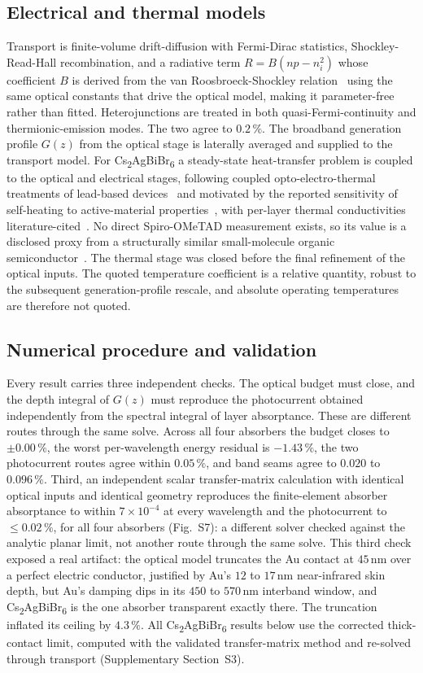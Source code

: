 \documentclass[lettersize,journal]{IEEEtran}
\newcommand{\CABB}{Cs\textsubscript{2}AgBiBr\textsubscript{6}}
\begin{document}
\subsection{Electrical and thermal models}
Transport is finite-volume drift-diffusion with Fermi-Dirac statistics,
Shockley-Read-Hall recombination, and a radiative term
$R = B(np-n_i^2)$ whose coefficient $B$ is derived from the van
Roosbroeck-Shockley relation~\cite{vanroosbroeck1954} using the same optical
constants that drive the optical model, making it parameter-free rather than
fitted. Heterojunctions are treated in both quasi-Fermi-continuity and
thermionic-emission modes. The two agree to $0.2\,\%$. The broadband
generation profile $G(z)$ from the optical stage is laterally averaged and
supplied to the transport model. For \CABB{} a steady-state heat-transfer
problem is coupled to the optical and electrical stages, following coupled
opto-electro-thermal treatments of lead-based
devices~\cite{saxena2019,bahrami2024,suldozi2026} and motivated by the
reported sensitivity of self-heating to active-material
properties~\cite{kamppinen2024}, with per-layer thermal conductivities
literature-cited~\cite{mun2007,oka2014,ho1972,zheng2024,li_cs2agbibr6_kappa}.
No direct Spiro-OMeTAD measurement exists, so its value is a disclosed proxy
from a structurally similar small-molecule organic
semiconductor~\cite{wang2015}. The
thermal stage was closed before the final refinement of the optical inputs.
The quoted temperature coefficient is a relative quantity, robust to the
subsequent generation-profile rescale, and absolute operating temperatures
are therefore not quoted.

\subsection{Numerical procedure and validation}
Every result carries three independent checks. The optical budget must close,
and the depth integral of $G(z)$ must reproduce the photocurrent obtained
independently from the spectral integral of layer absorptance. These are
different routes through the same solve. Across all four absorbers the budget
closes to $\pm0.00\,\%$, the worst per-wavelength energy residual is
$-1.43\,\%$, the two photocurrent routes agree within $0.05\,\%$, and band
seams agree to $0.020$ to $0.096\,\%$. Third, an independent scalar
transfer-matrix calculation with identical optical inputs and identical
geometry reproduces the finite-element absorber absorptance to within
$7\times10^{-4}$ at every wavelength and the photocurrent to
$\leq0.02\,\%$, for all four absorbers (Fig.~S7): a different solver
checked against the analytic planar limit, not another route through the same
solve. This third check exposed a real artifact: the optical model truncates
the Au contact at $45\,\mathrm{nm}$ over a perfect electric conductor,
justified by Au's $12$ to $17\,\mathrm{nm}$ near-infrared skin depth, but Au's
damping dips in its $450$ to $570\,\mathrm{nm}$ interband window, and \CABB{}
is the one absorber transparent exactly there. The truncation inflated its
ceiling by $4.3\,\%$. All \CABB{} results below use the corrected
thick-contact limit, computed with the validated transfer-matrix method and
re-solved through transport (Supplementary Section~S3).
\end{document}
